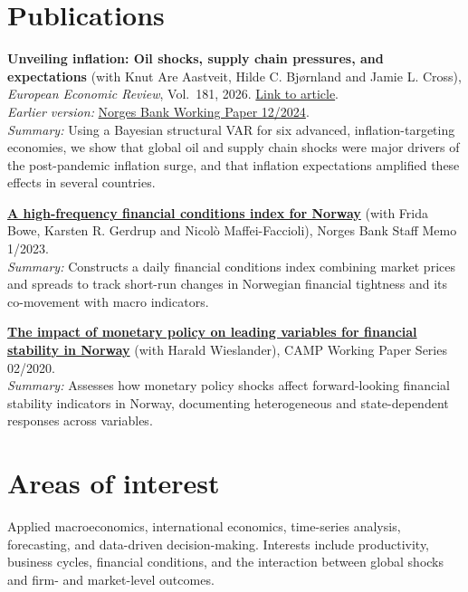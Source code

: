 \documentclass[a4paper,15pt]{article}
\begin{document}
\section{Publications}
\small{
\textbf{Unveiling inflation: Oil shocks, supply chain pressures, and expectations} (with Knut Are Aastveit, Hilde C. Bjørnland and Jamie L. Cross), \emph{European Economic Review}, Vol.\ 181, 2026.
\href{https://www.sciencedirect.com/science/article/pii/S0014292125002429}{Link to article}.\\
\emph{Earlier version:} \href{https://www.norges-bank.no/aktuelt/nyheter-og-hendelser/Signerte-publikasjoner/Working-Papers/2024/wp-122024/}{Norges Bank Working Paper 12/2024}.\\
\emph{Summary:} Using a Bayesian structural VAR for six advanced, inflation-targeting economies, we show that global oil and supply chain shocks were major drivers of the post-pandemic inflation surge, and that inflation expectations amplified these effects in several countries.
}\par\vspace{0.5em}
\small{
\href{https://www.norges-bank.no/aktuelt/publikasjoner/Staff-Memo/20232/sm-1-2023-fcin/}{\textbf{A high-frequency financial conditions index for Norway}} (with Frida Bowe, Karsten R. Gerdrup and Nicol\`o Maffei-Faccioli), Norges Bank Staff Memo 1/2023.\\
\emph{Summary:} Constructs a daily financial conditions index combining market prices and spreads to track short-run changes in Norwegian financial tightness and its co-movement with macro indicators.
}\par\vspace{0.5em}
\small{
\href{https://hdl.handle.net/11250/2647912}{\textbf{The impact of monetary policy on leading variables for financial stability in Norway}} (with Harald Wieslander), CAMP Working Paper Series 02/2020.\\
\emph{Summary:} Assesses how monetary policy shocks affect forward-looking financial stability indicators in Norway, documenting heterogeneous and state-dependent responses across variables.
}
\section{Areas of interest}
\small{Applied macroeconomics, international economics, time-series analysis, forecasting, and data-driven decision-making. Interests include productivity, business cycles, financial conditions, and the interaction between global shocks and firm- and market-level outcomes.}   \\
\end{document}
